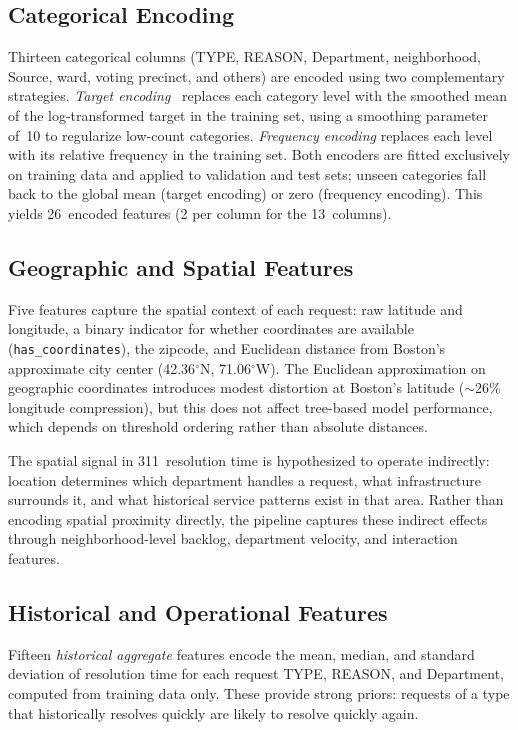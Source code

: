 \documentclass[sigconf,nonacm]{acmart}
\begin{document}
\subsection{Categorical Encoding}

Thirteen categorical columns (TYPE, REASON, Department,
neighborhood, Source, ward, voting precinct, and others) are
encoded using two complementary strategies.
\emph{Target encoding}~\cite{micci2001target} replaces each
category level with the smoothed mean of the log-transformed
target in the training set, using a smoothing parameter of~10 to
regularize low-count categories. \emph{Frequency encoding}
replaces each level with its relative frequency in the training
set. Both encoders are fitted exclusively on training data and
applied to validation and test sets; unseen categories fall back
to the global mean (target encoding) or zero (frequency
encoding). This yields 26~encoded features (2 per column for the
13~columns).

\subsection{Geographic and Spatial Features}

Five features capture the spatial context of each request:
raw latitude and longitude, a binary indicator for whether
coordinates are available (\texttt{has\_coordinates}), the
zipcode, and Euclidean distance from Boston's approximate city
center (42.36$^\circ$N, 71.06$^\circ$W). The Euclidean
approximation on geographic coordinates introduces modest
distortion at Boston's latitude ($\sim$26\% longitude
compression), but this does not affect tree-based model
performance, which depends on threshold ordering rather than
absolute distances.

The spatial signal in 311~resolution time is hypothesized to
operate indirectly: location determines which department handles
a request, what infrastructure surrounds it, and what historical
service patterns exist in that area. Rather than encoding spatial
proximity directly, the pipeline captures these indirect effects
through neighborhood-level backlog, department velocity, and
interaction features.

\subsection{Historical and Operational Features}

Fifteen \emph{historical aggregate} features encode the mean,
median, and standard deviation of resolution time for each
request TYPE, REASON, and Department, computed from training data
only. These provide strong priors: requests of a type that
historically resolves quickly are likely to resolve quickly again.
\end{document}
